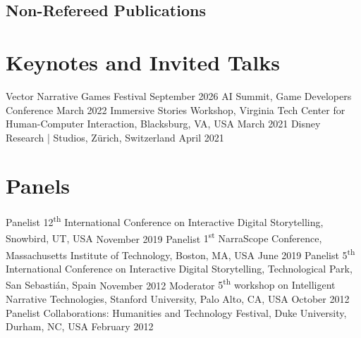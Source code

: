 \documentclass{cv}
\begin{document}
\subsection*{Non-Refereed Publications}
\begin{etaremune}
	\item {}
	\item {}
	\item {}
	\item {}
\end{etaremune}


\section*{Keynotes and Invited Talks}

	{Vector Narrative Games Festival}
	{September 2026}
	{AI Summit, Game Developers Conference}
	{March 2022}
	{Immersive Stories Workshop, Virginia Tech Center for Human-Computer Interaction, Blacksburg, VA, USA}
	{March 2021}
	{Disney Research | Studios, Zürich, Switzerland}
	{April 2021}

\section*{Panels}

	{Panelist}
	{12\textsuperscript{th} International Conference on Interactive Digital Storytelling, Snowbird, UT, USA}
	{November 2019}
	{Panelist}
	{1\textsuperscript{st} NarraScope Conference, Massachusetts Institute of Technology, Boston, MA, USA}
	{June 2019}
	{Panelist}
	{5\textsuperscript{th} International Conference on Interactive Digital Storytelling, Technological Park, San Sebastián, Spain}
	{November 2012}
	{Moderator}
	{5\textsuperscript{th} workshop on Intelligent Narrative Technologies, Stanford University, Palo Alto, CA, USA}
	{October 2012}
	{Panelist}
	{Collaborations: Humanities and Technology Festival, Duke University, Durham, NC, USA}
	{February 2012}
\end{document}
